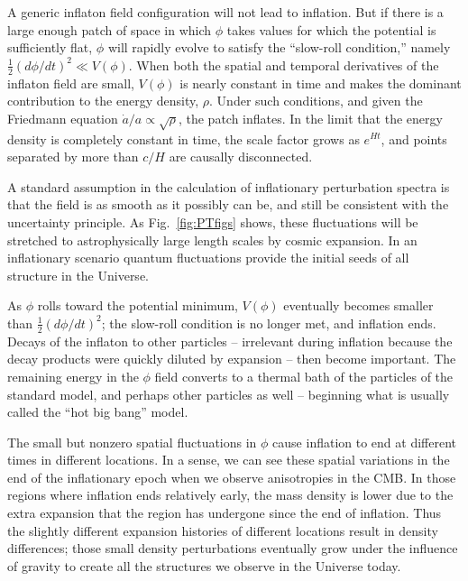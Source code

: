 A generic inflaton field configuration will not lead to inflation. But if there is a large enough patch of space in which $\phi$ takes values for which the potential is sufficiently flat, $\phi$ will rapidly evolve to satisfy the ``slow-roll condition,'' namely $\frac{1}{2} \left(d\phi/dt\right)^2 \ll V(\phi)$. When both the spatial and temporal derivatives of the inflaton field are small, $V(\phi)$ is nearly constant in time and makes the dominant contribution to the energy density, $\rho$. Under such conditions, and given the Friedmann equation $\dot a/a \propto \sqrt{\rho}$, the patch inflates. In the limit that the energy density is completely constant in time, the scale factor grows as $e^{H t}$, and points separated by more than $c/H$ are causally disconnected.

A standard assumption in the calculation of inflationary perturbation spectra is that the field is as smooth as it possibly can be, and still be consistent with the uncertainty principle. As Fig.~\ref{fig:PTfigs} shows, these fluctuations will be stretched to astrophysically large length scales by cosmic expansion. In an inflationary scenario quantum fluctuations provide the initial seeds of all structure in the Universe. 

As $\phi$ rolls toward the potential minimum, $V(\phi)$ eventually becomes smaller than $\frac{1}{2}(d\phi/dt)^2$; the slow-roll condition is no longer met, and inflation ends. Decays of the inflaton to other particles -- irrelevant during inflation because the decay products were quickly diluted by expansion -- then become important. The remaining energy in the $\phi$ field converts to a thermal bath of the particles of the standard model, and perhaps other particles as well -- beginning what is usually called the ``hot big bang'' model.

The small but nonzero spatial fluctuations in $\phi$ cause inflation to end at different times in different locations. In a sense, we can see these spatial variations in the end of the inflationary epoch when we observe anisotropies in the CMB.  In those regions where inflation ends relatively early, the mass density is lower due to the extra expansion that the region has undergone since the end of inflation. Thus the slightly different expansion histories of different locations result in density differences; those small density perturbations eventually grow under the influence of gravity to create all the structures we observe in the Universe today.

